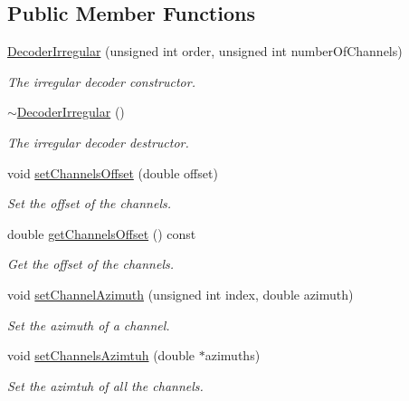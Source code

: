 \subsection*{Public Member Functions}
\begin{DoxyCompactItemize}
\item 
\hyperlink{class_hoa2_d_1_1_decoder_irregular_a6847d61194817c336f323f21b757a67a}{Decoder\-Irregular} (unsigned int order, unsigned int number\-Of\-Channels)
\begin{DoxyCompactList}\small\item\em The irregular decoder constructor. \end{DoxyCompactList}\item 
\hyperlink{class_hoa2_d_1_1_decoder_irregular_af8a618d1d04c00f33c360fde6d09e03f}{$\sim$\-Decoder\-Irregular} ()
\begin{DoxyCompactList}\small\item\em The irregular decoder destructor. \end{DoxyCompactList}\item 
void \hyperlink{class_hoa2_d_1_1_decoder_irregular_a0998a88c2f0c45fe02caa7a22966c807}{set\-Channels\-Offset} (double offset)
\begin{DoxyCompactList}\small\item\em Set the offset of the channels. \end{DoxyCompactList}\item 
double \hyperlink{class_hoa2_d_1_1_decoder_irregular_a413f5d995d8c9f9147ff5bc7f3140625}{get\-Channels\-Offset} () const 
\begin{DoxyCompactList}\small\item\em Get the offset of the channels. \end{DoxyCompactList}\item 
void \hyperlink{class_hoa2_d_1_1_decoder_irregular_a3bc83d37db5c22105fa6948be376b16b}{set\-Channel\-Azimuth} (unsigned int index, double azimuth)
\begin{DoxyCompactList}\small\item\em Set the azimuth of a channel. \end{DoxyCompactList}\item 
void \hyperlink{class_hoa2_d_1_1_decoder_irregular_acace6638ba2c2f8fe3156989d730f44b}{set\-Channels\-Azimtuh} (double $\ast$azimuths)
\begin{DoxyCompactList}\small\item\em Set the azimtuh of all the channels. \end{DoxyCompactList}\item 

\end{DoxyCompactItemize}
